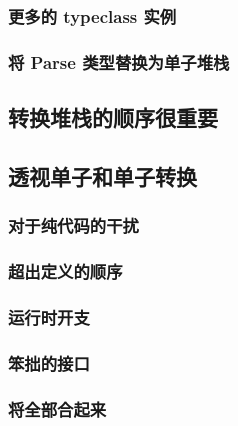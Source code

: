 \documentclass[./main.tex]{subfiles}
\begin{document}
\begin{lstlisting}[language=Haskell]

\end{lstlisting}



\begin{lstlisting}[language=Haskell]

\end{lstlisting}



\begin{lstlisting}[language=Haskell]

\end{lstlisting}



\begin{lstlisting}[language=Haskell]

\end{lstlisting}

\subsubsection*{更多的 typeclass 实例}

\subsubsection*{将 Parse 类型替换为单子堆栈}

\subsection*{转换堆栈的顺序很重要}

\subsection*{透视单子和单子转换}

\subsubsection*{对于纯代码的干扰}

\subsubsection*{超出定义的顺序}

\subsubsection*{运行时开支}

\subsubsection*{笨拙的接口}

\subsubsection*{将全部合起来}
\end{document}

